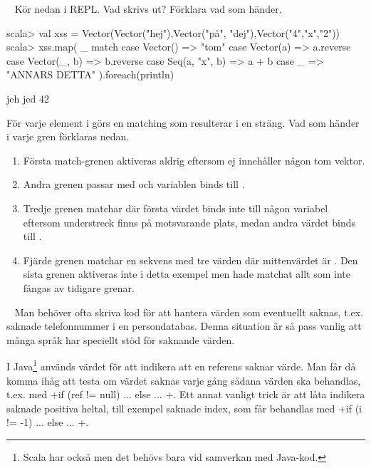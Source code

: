 \QUESTEND






\QUESTBEGIN

\Task \what ~ Kör nedan i REPL. Vad skrivs ut? Förklara vad som händer.
\begin{REPL}
scala> val xss = Vector(Vector("hej"),Vector("på", "dej"),Vector("4","x","2"))
scala> xss.map( _ match {
  case Vector() => "tom"
  case Vector(a) => a.reverse
  case Vector(_, b) => b.reverse
  case Seq(a, "x", b) => a + b
  case _ => "ANNARS DETTA"
} ).foreach(println)
\end{REPL}


\SOLUTION

\TaskSolved \what

\begin{REPL}
jeh
jed
42
\end{REPL}
För varje element i  görs en matching som resulterar i en sträng. Vad som händer i varje gren förklaras nedan.
\begin{enumerate}
  \item Första match-grenen aktiveras aldrig eftersom  ej innehåller någon tom vektor.
  \item Andra grenen passar med  och variablen  binds till .
  \item Tredje grenen matchar  där första värdet binds inte till någon variabel eftersom understreck finns på motsvarande plats, medan andra värdet binds till .
  \item Fjärde grenen matchar en sekvens med tre värden där mittenvärdet är . Den sista grenen aktiveras inte i detta exempel men hade matchat allt som inte fångas av tidigare grenar.
\end{enumerate}

\QUESTEND





\QUESTBEGIN

\Task  \what~  Man behöver ofta skriva kod för att hantera värden som eventuellt saknas, t.ex. saknade telefonnummer i en persondatabas. Denna situation är så pass vanlig att många språk har speciellt stöd för saknande värden.

I Java\footnote{Scala har också  men det behövs bara vid samverkan med Java-kod.} används värdet  för att indikera att en referens saknar värde. Man får då komma ihåg att testa om värdet saknas varje gång sådana värden ska behandlas, t.ex. med \code+if (ref != null) { ...} else { ... }+. Ett annat vanligt trick är att låta  indikera saknade positiva heltal, till exempel saknade index, som får behandlas med \code+if (i != -1) { ...} else { ... }+.

